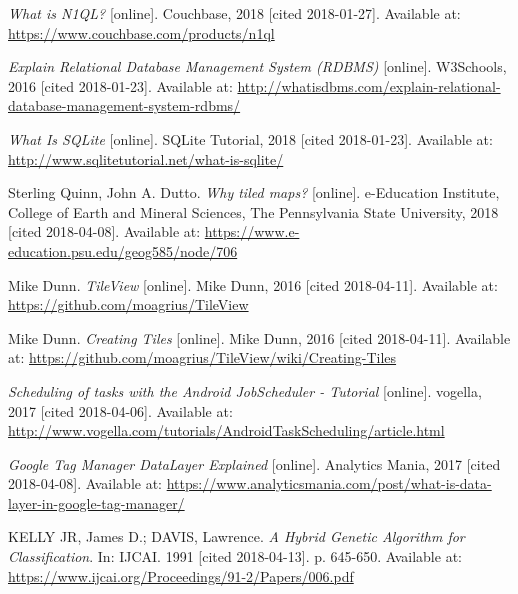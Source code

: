 \begin{thebibliography}{10}
\textit{What is N1QL?} [online]. Couchbase, 2018 [cited 2018-01-27]. Available at: \url{https://www.couchbase.com/products/n1ql}

\textit{Explain Relational Database Management System (RDBMS)} [online]. W3Schools, 2016 [cited 2018-01-23]. Available at: \url{http://whatisdbms.com/explain-relational-database-management-system-rdbms/}

\textit{What Is SQLite} [online]. SQLite Tutorial, 2018 [cited 2018-01-23]. Available at: \url{http://www.sqlitetutorial.net/what-is-sqlite/}

Sterling Quinn, John A. Dutto. \textit{Why tiled maps?} [online]. e-Education Institute, College of Earth and Mineral Sciences, The Pennsylvania State University, 2018 [cited 2018-04-08]. Available at: \url{https://www.e-education.psu.edu/geog585/node/706}

Mike Dunn. \textit{TileView} [online]. Mike Dunn, 2016 [cited 2018-04-11]. Available at: \url{https://github.com/moagrius/TileView}

Mike Dunn. \textit{Creating Tiles} [online]. Mike Dunn, 2016 [cited 2018-04-11]. Available at: \url{https://github.com/moagrius/TileView/wiki/Creating-Tiles}

\textit{Scheduling of tasks with the Android JobScheduler - Tutorial} [online]. vogella, 2017 [cited 2018-04-06]. Available at: \url{http://www.vogella.com/tutorials/AndroidTaskScheduling/article.html}

\textit{Google Tag Manager DataLayer Explained} [online]. Analytics Mania, 2017 [cited 2018-04-08]. Available at: \url{https://www.analyticsmania.com/post/what-is-data-layer-in-google-tag-manager/}

KELLY JR, James D.; DAVIS, Lawrence. \textit{A Hybrid Genetic Algorithm for Classification}. In: IJCAI. 1991 [cited 2018-04-13]. p. 645-650. Available at: \url{https://www.ijcai.org/Proceedings/91-2/Papers/006.pdf}

\end{thebibliography}